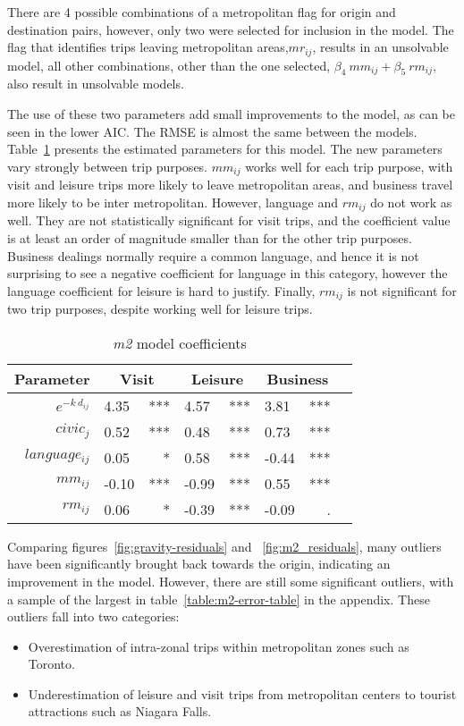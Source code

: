 There are 4 possible combinations of a metropolitan flag for origin and destination pairs, however, only two were selected for inclusion in the model. The flag that identifies trips leaving metropolitan areas,$mr_{ij}$, results in an unsolvable model, all other combinations, other than the one selected, $\beta_4~mm_{ij} + \beta_5~rm_{ij}$, also result in unsolvable models. 

The use of these two parameters add small improvements to the model, as can be seen in the lower AIC. The RMSE is almost the same between the models. Table~\ref{table:m2-coeff} presents the estimated parameters for this model. The new parameters vary strongly between trip purposes. 
$mm_{ij}$  works well for each trip purpose, with visit and leisure trips more likely to leave metropolitan areas, and business travel more likely to be inter metropolitan. However, language and $rm_{ij}$  do not work as well. They are not statistically significant for visit trips, and the coefficient value is at least an order of magnitude smaller than for the other trip purposes. Business dealings normally require a common language, and hence it is not surprising to see a negative coefficient for language in this category, however the language coefficient for leisure is hard to justify. Finally, $rm_{ij}$  is not significant for two trip purposes, despite working well for leisure trips. 

\begin{table}[H]
\centering
\caption{\textit{m2} model coefficients}
\label{table:m2-coeff}
\begin{tabular}{@{}rlrlrlrl@{}}
  \toprule
 Parameter & \multicolumn{2}{c}{Visit} & \multicolumn{2}{c}{Leisure} & \multicolumn{2}{c}{Business} &  \\ \midrule
  $e^{-k\ d_{ij}}$ 	& 4.35 & *** & 4.57 & *** & 3.81 & *** \\  
  $civic_j$ 		& 0.52 	& *** & 0.48 & *** & 0.73 & *** \\  
  $language_{ij}$ 	& 0.05 & * & 0.58 & *** & -0.44 & *** \\ 
  $mm_{ij}$  		& -0.10 & *** & -0.99 & *** & 0.55 & *** \\ 
  $rm_{ij}$			& 0.06 & * & -0.39 & *** & -0.09 & . \\  
   \bottomrule
\end{tabular}
\end{table}

Comparing figures~\ref{fig:gravity-residuals} and ~\ref{fig:m2_residuals}, many outliers have been significantly brought back towards the origin, indicating an improvement in the model. However, there are still some significant outliers, with a sample of the largest in table~\ref{table:m2-error-table} in the appendix. These outliers fall into two categories:
\begin{itemize}
\item Overestimation of intra-zonal trips within metropolitan zones such as Toronto.
\item Underestimation of leisure and visit trips from metropolitan centers to tourist attractions such as Niagara Falls.
\end{itemize}

